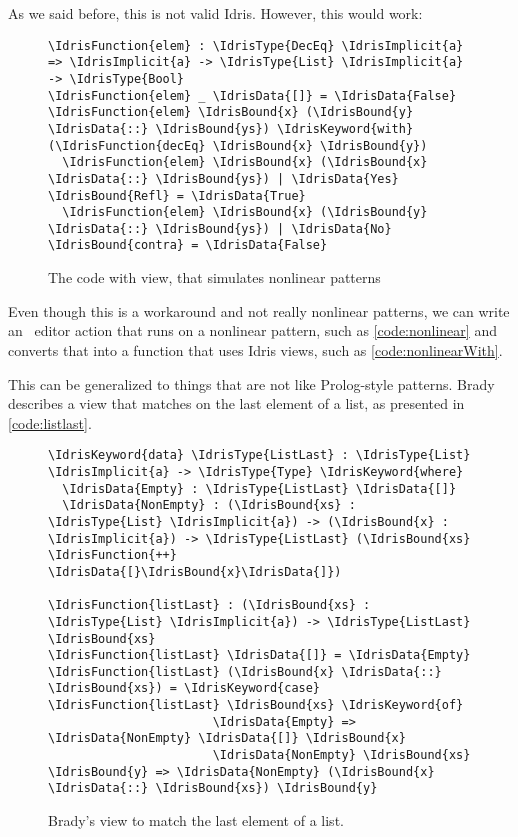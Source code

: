 As we said before, this is not valid Idris. However, this would work:

\begin{figure}[ht]
\caption{The code with view, that simulates nonlinear patterns}
\label{code:nonlinearWith}
\begin{Verbatim}[framesep=2mm, label=\footnotesize{\normalfont{Idris}}, labelposition=topline]
\IdrisFunction{elem} : \IdrisType{DecEq} \IdrisImplicit{a} => \IdrisImplicit{a} -> \IdrisType{List} \IdrisImplicit{a} -> \IdrisType{Bool}
\IdrisFunction{elem} _ \IdrisData{[]} = \IdrisData{False}
\IdrisFunction{elem} \IdrisBound{x} (\IdrisBound{y} \IdrisData{::} \IdrisBound{ys}) \IdrisKeyword{with} (\IdrisFunction{decEq} \IdrisBound{x} \IdrisBound{y})
  \IdrisFunction{elem} \IdrisBound{x} (\IdrisBound{x} \IdrisData{::} \IdrisBound{ys}) | \IdrisData{Yes} \IdrisBound{Refl} = \IdrisData{True}
  \IdrisFunction{elem} \IdrisBound{x} (\IdrisBound{y} \IdrisData{::} \IdrisBound{ys}) | \IdrisData{No} \IdrisBound{contra} = \IdrisData{False}
\end{Verbatim}
\end{figure}

Even though this is a workaround and not really nonlinear patterns, we can
write an \Elab\ editor action that runs on a nonlinear pattern, such as
\autoref{code:nonlinear} and converts that into a function that uses Idris
views, such as \autoref{code:nonlinearWith}.

This can be generalized to things that are not like Prolog-style patterns.
Brady describes a view that matches on the last element of
a list, as presented in \autoref{code:listlast}.

\begin{figure}[ht]
\caption{Brady's view to match the last element of a list.\cite{tdd}}
\label{code:listlast}
\begin{Verbatim}[framesep=2mm, label=\footnotesize{\normalfont{Idris}}, labelposition=topline]
\IdrisKeyword{data} \IdrisType{ListLast} : \IdrisType{List} \IdrisImplicit{a} -> \IdrisType{Type} \IdrisKeyword{where}
  \IdrisData{Empty} : \IdrisType{ListLast} \IdrisData{[]}
  \IdrisData{NonEmpty} : (\IdrisBound{xs} : \IdrisType{List} \IdrisImplicit{a}) -> (\IdrisBound{x} : \IdrisImplicit{a}) -> \IdrisType{ListLast} (\IdrisBound{xs} \IdrisFunction{++} \IdrisData{[}\IdrisBound{x}\IdrisData{]})

\IdrisFunction{listLast} : (\IdrisBound{xs} : \IdrisType{List} \IdrisImplicit{a}) -> \IdrisType{ListLast} \IdrisBound{xs}
\IdrisFunction{listLast} \IdrisData{[]} = \IdrisData{Empty}
\IdrisFunction{listLast} (\IdrisBound{x} \IdrisData{::} \IdrisBound{xs}) = \IdrisKeyword{case} \IdrisFunction{listLast} \IdrisBound{xs} \IdrisKeyword{of}
                       \IdrisData{Empty} => \IdrisData{NonEmpty} \IdrisData{[]} \IdrisBound{x}
                       \IdrisData{NonEmpty} \IdrisBound{xs} \IdrisBound{y} => \IdrisData{NonEmpty} (\IdrisBound{x} \IdrisData{::} \IdrisBound{xs}) \IdrisBound{y}
\end{Verbatim}
\end{figure}

